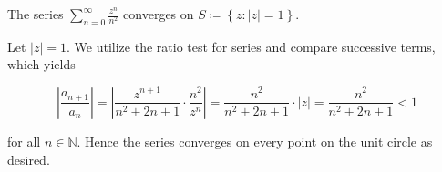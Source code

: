 The series $\sum\limits_{n=0}^{\infty}{\frac{z^n}{n^2}}$ converges on $S \coloneqq \left\{ z \colon |z| = 1 \right\}$.

\begin{solution}
    Let $|z| = 1$. We utilize the ratio test for series and compare successive terms, which yields

    $$
    \left| \frac{a_{n+1}}{a_n} \right| = \left| \frac{z^{n+1}}{n^2 + 2n + 1} \cdot \frac{n^2}{z^n} \right|
                                       = \frac{n^2}{n^2 + 2n + 1} \cdot \left| z \right|
                                       = \frac{n^2}{n^2 + 2n + 1}
                                       < 1
    $$

    for all $n \in \mathbb{N}$. Hence the series converges on every point on the unit circle as desired.
    \ \\
\end{solution}